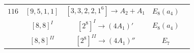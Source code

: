 \documentclass[reqno,12pt]{amsart}
\numberwithin{equation}{section}
\theoremstyle{plain}
\theoremstyle{definition}
\begin{document}
\begin{table}[htbp]
\begin{tabular}{|c|c|c|c|c|}
 $ 116 $    &  $ [9,5,1,1] $  & $[3,3,2,2,1^6]\rightarrow     A_2+A_1$     &   $ E_8(a_4)$      \\ 
         &  $ [8,8]^I $  & $[2^8]^I\rightarrow    (4A_1)' $     &   $ E_8(a_4)$      \\
        &   $ [8,8]^{II} $  & $[2^8]^{II}\rightarrow    (4A_1)'' $     &   $ E_7$      \\ 
        
        \hline
 
 
 
 
 \end{tabular}
	\bigskip
	
\end{table}



\newpage 
\end{document}
